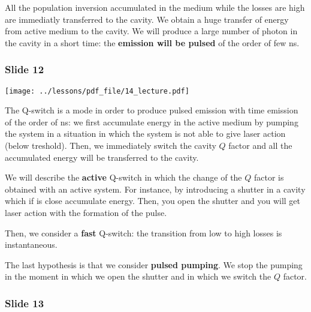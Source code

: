 \documentclass[../main/main.tex]{subfiles}
\begin{document}
All the population inversion accumulated in the medium while the losses are high are immediatly transferred to the cavity. We obtain a huge transfer of energy from active medium to the cavity. We will produce a large number of photon in the cavity in a short time: the \textbf{emission will be pulsed} of the order of few ns.

\subsubsection*{Slide 12}

\begin{minipage}[]{0.5\linewidth}
\centering
\texttt{[image: ../lessons/pdf\_file/14\_lecture.pdf]}
\end{minipage}
\hspace{0.3cm}\vspace{0.3cm}
\begin{minipage}[c]{0.47\linewidth}

The Q-switch is a mode in order to produce pulsed emission with time emission of the order of ns: we first accumulate energy in the active medium by pumping the system in a situation in which the system is not able to give laser action (below treshold). Then, we immediately switch the cavity \( Q \) factor and all the accumulated energy will be transferred to the cavity.

We will describe the \textbf{active} Q-switch in which the change of the \( Q \) factor is obtained with an active system. For instance, by introducing a shutter in a cavity which if is close accumulate energy. Then, you open the shutter and you will get laser action with the formation of the pulse.

Then, we consider a \textbf{fast} Q-switch: the transition from low to high losses is instantaneous.

The last hypothesis is that we consider \textbf{pulsed pumping}. We stop the pumping in the moment in which we open the shutter and in which we switch the \( Q \) factor.

\end{minipage}


\subsubsection*{Slide 13}
\end{document}

